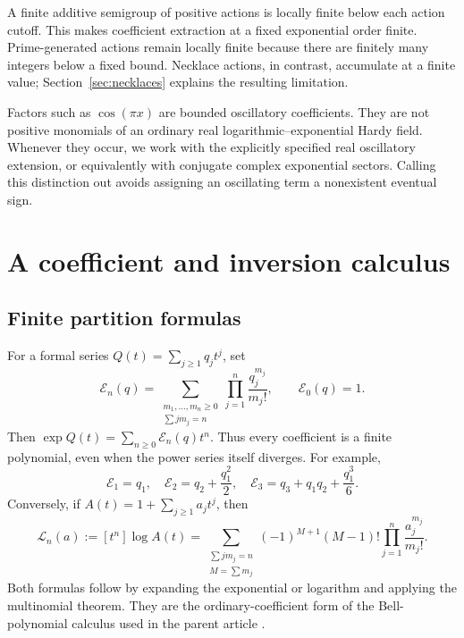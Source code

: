 \documentclass[11pt,a4paper]{article}
\numberwithin{equation}{section}
\theoremstyle{definition}
\theoremstyle{remark}
\newcommand{\cE}{\mathcal E}
\newcommand{\cL}{\mathcal L}
\begin{document}
A finite additive semigroup of positive actions is locally finite below each action cutoff. This makes coefficient extraction at a fixed exponential order finite. Prime-generated actions remain locally finite because there are finitely many integers below a fixed bound. Necklace actions, in contrast, accumulate at a finite value; Section~\ref{sec:necklaces} explains the resulting limitation.

Factors such as $\cos(\pi x)$ are bounded oscillatory coefficients. They are not positive monomials of an ordinary real logarithmic--exponential Hardy field. Whenever they occur, we work with the explicitly specified real oscillatory extension, or equivalently with conjugate complex exponential sectors. Calling this distinction out avoids assigning an oscillating term a nonexistent eventual sign.

\section{A coefficient and inversion calculus}
\label{sec:calculus}

\subsection{Finite partition formulas}

For a formal series $Q(t)=\sum_{j\ge1}q_jt^j$, set
\begin{equation}
 \cE_n(q)=
 \sum_{\substack{m_1,\ldots,m_n\ge0\\\sum j m_j=n}}
       \prod_{j=1}^n\frac{q_j^{m_j}}{m_j!},
 \qquad \cE_0(q)=1.
 \label{eq:E}
\end{equation}
Then $\exp Q(t)=\sum_{n\ge0}\cE_n(q)t^n$. Thus every coefficient is a finite polynomial, even when the power series itself diverges. For example,
\[
 \cE_1=q_1,\quad
 \cE_2=q_2+\frac{q_1^2}{2},\quad
 \cE_3=q_3+q_1q_2+\frac{q_1^3}{6}.
\]
Conversely, if $A(t)=1+\sum_{j\ge1}a_jt^j$, then
\begin{equation}
 \cL_n(a):=[t^n]\log A(t)
 =\sum_{\substack{\sum j m_j=n\\M=\sum m_j}}
   (-1)^{M+1}(M-1)!\prod_{j=1}^n\frac{a_j^{m_j}}{m_j!}.
 \label{eq:L}
\end{equation}
Both formulas follow by expanding the exponential or logarithm and applying the multinomial theorem. They are the ordinary-coefficient form of the Bell-polynomial calculus used in the parent article \cite{base}.
\end{document}
